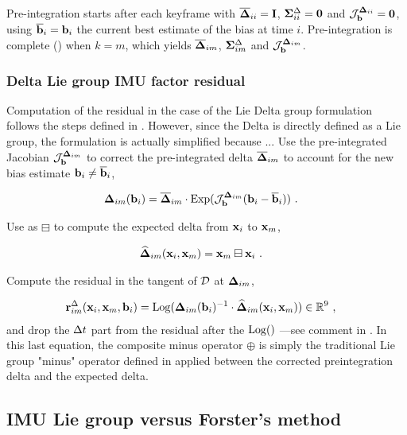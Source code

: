 Pre-integration starts after each keyframe with $\overline{{{\bm \Delta}}}_{ii} = {\bf I}$, ${\bm \Sigma}^\Delta_{ii} = \bf0$ and ${\mathcal{J}^{{{\bm \Delta}}_{ii}}_{{\bf b}}} = \bf0$, using $\overline{{\bf b}}_i = {\bf b}_i$ the current best estimate of the bias at time $i$.
Pre-integration is complete () when $k=m$, which yields $\overline{{{\bm \Delta}}}_{im}$, ${\bm \Sigma}^\Delta_{im}$ and ${\mathcal{J}^{{{\bm \Delta}}_{im}}_{{\bf b}}}$.


\subsubsection{Delta Lie group IMU factor residual}
Computation of the residual in the case of the Lie Delta group formulation follows the steps defined in .
However, since the Delta is directly defined as a Lie group, the formulation is actually simplified because  ... 
Use the pre-integrated Jacobian ${\mathcal{J}^{{{\bm \Delta}}_{im}}_{{\bf b}}}$ to correct the pre-integrated delta $\overline{{{\bm \Delta}}}_{im}$ to account for the new bias estimate ${\bf b}_i\neq\overline{{\bf b}}_i$,

\begin{align}
    {{\bm \Delta}}_{im}({\bf b}_i) &= \overline{{{\bm \Delta}}}_{im}\cdot\operatorname*{Exp}({\mathcal{J}^{{{\bm \Delta}}_{im}}_{{\bf b}}}({\bf b}_i-\overline{{\bf b}}_i)) 
    ~.
\end{align}

Use  as $\boxminus$ to compute the expected delta from  ${\bf x}_i$ to ${\bf x}_m$,

\begin{align}
    \widehat{{{\bm \Delta}}}_{im}({\bf x}_i,{\bf x}_m) &= {\bf x}_m \boxminus {\bf x}_i 
    ~.
\end{align}

Compute the residual in the  tangent of $\mathcal{D}$ at ${{\bm \Delta}}_{im}$,

\begin{align}
    {\bf r}^\Delta_{im}({\bf x}_i,{\bf x}_m,{\bf b}_i) &= \operatorname*{Log}({{\bm \Delta}}_{im}({\bf b}_i)^{-1} \cdot \widehat{{{\bm \Delta}}}_{im}({\bf x}_i,{\bf x}_m)) \in {\mathbb R}^9
~,
\end{align}
%
and drop the $\Delta t$ part from the residual after the $\operatorname*{Log}()$ ---see comment in .
In this last equation, the composite minus operator $\oplus$ is simply the traditional Lie group "minus" operator defined in \cite{sola2018micro} applied
between the corrected preintegration delta and the expected delta.



\subsection{IMU Lie group versus Forster's method}

